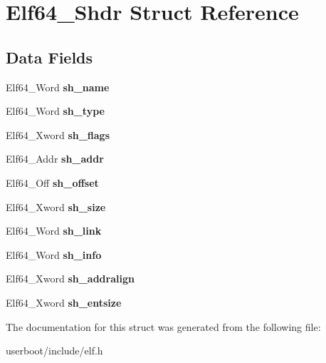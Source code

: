 \hypertarget{structElf64__Shdr}{}\section{Elf64\+\_\+\+Shdr Struct Reference}
\label{structElf64__Shdr}
\subsection*{Data Fields}
\begin{DoxyCompactItemize}
\item 
Elf64\+\_\+\+Word {\bfseries sh\+\_\+name}\hypertarget{structElf64__Shdr_a18f4475eeec871316099323b512d999d}{}\label{structElf64__Shdr_a18f4475eeec871316099323b512d999d}

\item 
Elf64\+\_\+\+Word {\bfseries sh\+\_\+type}\hypertarget{structElf64__Shdr_a6379cd77214969499ae99e6e8a46405c}{}\label{structElf64__Shdr_a6379cd77214969499ae99e6e8a46405c}

\item 
Elf64\+\_\+\+Xword {\bfseries sh\+\_\+flags}\hypertarget{structElf64__Shdr_a20aab677eb99c91c0e6c3c5dc8f0f3db}{}\label{structElf64__Shdr_a20aab677eb99c91c0e6c3c5dc8f0f3db}

\item 
Elf64\+\_\+\+Addr {\bfseries sh\+\_\+addr}\hypertarget{structElf64__Shdr_ac4ee2ceaec74ab5704ebba226e83b200}{}\label{structElf64__Shdr_ac4ee2ceaec74ab5704ebba226e83b200}

\item 
Elf64\+\_\+\+Off {\bfseries sh\+\_\+offset}\hypertarget{structElf64__Shdr_afd5e899b00b6527bbecf9cd4bda50112}{}\label{structElf64__Shdr_afd5e899b00b6527bbecf9cd4bda50112}

\item 
Elf64\+\_\+\+Xword {\bfseries sh\+\_\+size}\hypertarget{structElf64__Shdr_a8988fd6e383835e9d51344eddf38ef24}{}\label{structElf64__Shdr_a8988fd6e383835e9d51344eddf38ef24}

\item 
Elf64\+\_\+\+Word {\bfseries sh\+\_\+link}\hypertarget{structElf64__Shdr_a29812c42d9310eb3ad17dcd68ec25536}{}\label{structElf64__Shdr_a29812c42d9310eb3ad17dcd68ec25536}

\item 
Elf64\+\_\+\+Word {\bfseries sh\+\_\+info}\hypertarget{structElf64__Shdr_a72dd754689db27582817c0691f7d0c77}{}\label{structElf64__Shdr_a72dd754689db27582817c0691f7d0c77}

\item 
Elf64\+\_\+\+Xword {\bfseries sh\+\_\+addralign}\hypertarget{structElf64__Shdr_ab6b9f67208a04cc0d374203c0a3ab93a}{}\label{structElf64__Shdr_ab6b9f67208a04cc0d374203c0a3ab93a}

\item 
Elf64\+\_\+\+Xword {\bfseries sh\+\_\+entsize}\hypertarget{structElf64__Shdr_a879406e9ddf2bd7e45346d430d0aaa44}{}\label{structElf64__Shdr_a879406e9ddf2bd7e45346d430d0aaa44}

\end{DoxyCompactItemize}


The documentation for this struct was generated from the following file\+:\begin{DoxyCompactItemize}
\item 
userboot/include/elf.\+h\end{DoxyCompactItemize}
